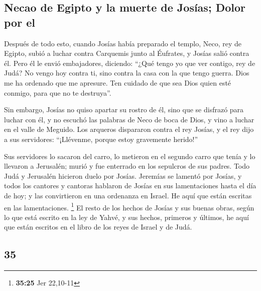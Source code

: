 \begin{paracol}{2}
\hypertarget{necao-de-egipto-y-la-muerte-de-josuxedas-dolor-por-el}{%
\subsection{Necao de Egipto y la muerte de Josías; Dolor por
el}\label{necao-de-egipto-y-la-muerte-de-josuxedas-dolor-por-el}}

 Después de todo esto, cuando Josías había preparado el
templo, Neco, rey de Egipto, subió a luchar contra Carquemis junto al
Éufrates, y Josías salió contra él.  Pero él le envió
embajadores, diciendo: ``¿Qué tengo yo que ver contigo, rey de Judá? No
vengo hoy contra ti, sino contra la casa con la que tengo guerra. Dios
me ha ordenado que me apresure. Ten cuidado de que sea Dios quien esté
conmigo, para que no te destruya''.

 Sin embargo, Josías no quiso apartar su rostro de él,
sino que se disfrazó para luchar con él, y no escuchó las palabras de
Neco de boca de Dios, y vino a luchar en el valle de Meguido.
 Los arqueros dispararon contra el rey Josías, y el rey
dijo a sus servidores: ``¡Llévenme, porque estoy gravemente herido!''

 Sus servidores lo sacaron del carro, lo metieron en el
segundo carro que tenía y lo llevaron a Jerusalén; murió y fue enterrado
en los sepulcros de sus padres. Todo Judá y Jerusalén hicieron duelo por
Josías.  Jeremías se lamentó por Josías, y todos los
cantores y cantoras hablaron de Josías en sus lamentaciones hasta el día
de hoy; y las convirtieron en una ordenanza en Israel. He aquí que están
escritas en las lamentaciones. \footnote{\textbf{35:25} Jer 22,10-11}
 El resto de los hechos de Josías y sus buenas obras,
según lo que está escrito en la ley de Yahvé,  y sus
hechos, primeros y últimos, he aquí que están escritos en el libro de
los reyes de Israel y de Judá.

\switchcolumn
\begin{otherlanguage}{english}

\hypertarget{section-69}{%
\section{35}\label{section-69}}


\end{otherlanguage}
\end{paracol}
